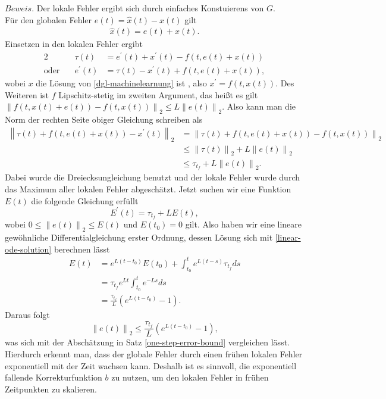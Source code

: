 $Beweis.$ Der lokale Fehler ergibt sich durch einfaches Konstuierens von $G$.\\
Für den globalen Fehler $e(t) = \hat{x}(t) - x(t)$ gilt
\begin{align*}
    \hat{x}(t) = e(t) + x(t).
\end{align*}
Einsetzen in den lokalen Fehler ergibt
\begin{alignat*}{2}
    &\tau(t) &= e^{\prime}(t) + x^{\prime}(t) - f(t,e(t)+x(t))\\
    \text{oder} \quad &e^{\prime}(t) &= \tau(t) - x^{\prime}(t) + f(t,e(t) + x(t)),
\end{alignat*}
wobei $x$ die Lösung von \eqref{dgl-machinelearnung} ist , also $x^{\prime}=f(t,x(t))$. Des Weiteren ist $f$
Lipschitz-stetig im zweiten Argument,
das heißt es gilt $\left\lVert f(t,x(t)+e(t)) - f(t,x(t)) \right\rVert_2 \leq L \left\lVert e(t) \right\rVert_2$. Also kann
man die Norm der rechten Seite obiger Gleichung schreiben als
\begin{align*}
    \left\lVert \tau(t) + f(t,e(t) + x(t)) - x^{\prime}(t) \right\rVert_2
    &= \left\lVert \tau(t) + f(t,e(t) + x(t)) - f(t,x(t)) \right\rVert_2 \\
    &\leq \left\lVert \tau(t) \right\rVert_2 + L\left\lVert e(t) \right\rVert_2 \\
    &\leq \tau_{t_f} + L \left\lVert e(t) \right\rVert_2.
\end{align*}
Dabei wurde die Dreiecksungleichung benutzt und der lokale Fehler wurde durch das Maximum aller lokalen Fehler
abgeschätzt. Jetzt suchen wir eine Funktion $E(t)$ die folgende Gleichung erfüllt
\[
    E^{\prime}(t) = \tau_{t_f} + L E(t),
\]
wobei $0 \leq \left\lVert e(t) \right\rVert_2 \leq E(t)$ und $E(t_0) = 0$ gilt. Also haben wir eine lineare gewöhnliche
Differentialgleichung erster Ordnung, dessen Lösung sich mit \eqref{linear-ode-solution} berechnen lässt
\begin{align*}
    E(t) &= e^{L(t-t_0)}E(t_0) + \int_{t_0}^{t}e^{L(t-s)}\tau_{t_f} ds \\
    &= \tau_{t_f} e^{Lt} \int_{t_0}^{t}e^{-Ls} ds \\
    &= \frac{\tau_{t_f} }{L} \left( e^{L(t-t_0)} - 1 \right).
\end{align*}
Daraus folgt
\[
    \left\lVert e(t) \right\rVert_2 \leq \frac{\tau_{t_f}}{L} \left( e^{L(t-t_0)} - 1 \right),
\]
was sich mit der Abschätzung in Satz \eqref{one-step-error-bound} vergleichen lässt. \qedwhite\\
Hierdurch erkennt man, dass der globale Fehler durch einen frühen lokalen Fehler exponentiell mit der Zeit wachsen
kann. Deshalb ist es sinnvoll, die exponentiell fallende Korrekturfunktion $b$ zu nutzen, um den lokalen Fehler in
frühen Zeitpunkten zu skalieren.

